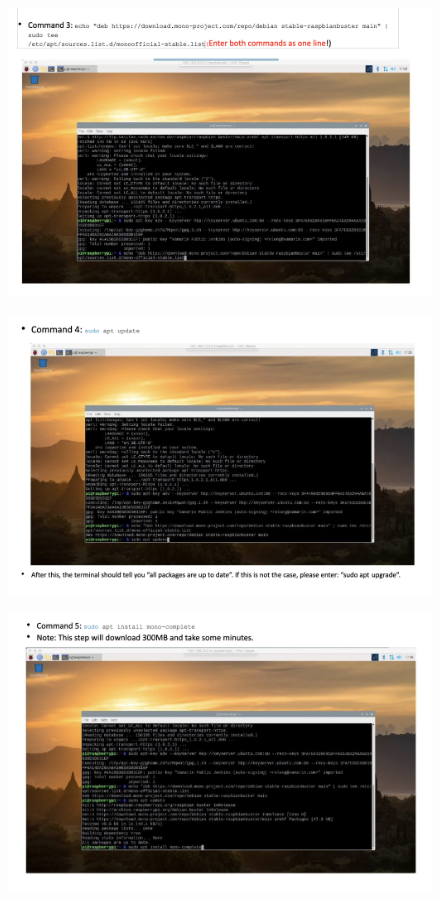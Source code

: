 \begin{figure}[h!]
\centering
\includegraphics[width=\columnwidth]{./Figures/config_img4.png}
\end{figure}

\begin{figure}[h!]
\centering
\includegraphics[width=\columnwidth]{./Figures/config_img5.png}
\end{figure}

\begin{figure}[h!]
\centering
\includegraphics[width=\columnwidth]{./Figures/config_img6.png}
\end{figure}

